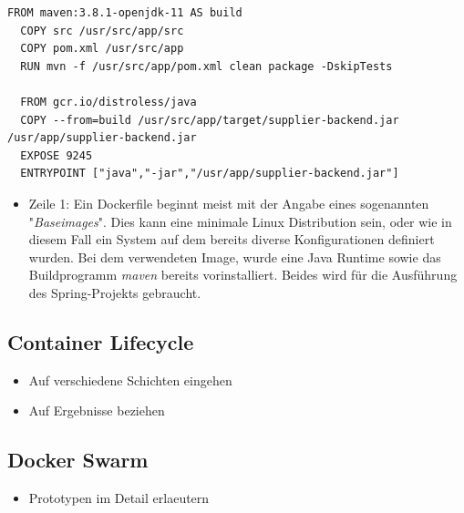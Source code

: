 \begin{minipage}{\linewidth}
\begin{lstlisting}[style=javaStyle,caption={Supplier - Bi Consumer},label=lst:supplierParserEndpoint]
  FROM maven:3.8.1-openjdk-11 AS build
  COPY src /usr/src/app/src
  COPY pom.xml /usr/src/app
  RUN mvn -f /usr/src/app/pom.xml clean package -DskipTests

  FROM gcr.io/distroless/java
  COPY --from=build /usr/src/app/target/supplier-backend.jar /usr/app/supplier-backend.jar
  EXPOSE 9245
  ENTRYPOINT ["java","-jar","/usr/app/supplier-backend.jar"]
\end{lstlisting}
\end{minipage}

\begin{itemize}
  \item Zeile 1: Ein Dockerfile beginnt meist mit der Angabe eines sogenannten "\emph{Baseimages}". Dies kann eine minimale Linux Distribution sein, oder wie in diesem Fall ein System auf dem bereits diverse Konfigurationen definiert wurden. Bei dem verwendeten Image, wurde eine Java Runtime sowie das Buildprogramm \emph{maven} bereits vorinstalliert. Beides wird für die Ausführung des Spring-Projekts gebraucht. 
\end{itemize}







\subsection{Container Lifecycle}
\begin{itemize}
  \item Auf verschiedene Schichten eingehen
  \item Auf Ergebnisse beziehen
\end{itemize}
\subsection{Docker Swarm}

\begin{itemize}
  \item Prototypen im Detail erlaeutern
\end{itemize}


\renewcommand\theadalign{bc}
\renewcommand\theadfont{\bfseries}
\renewcommand\theadgape{\Gape[4pt]}
\renewcommand\cellgape{\Gape[4pt]}





